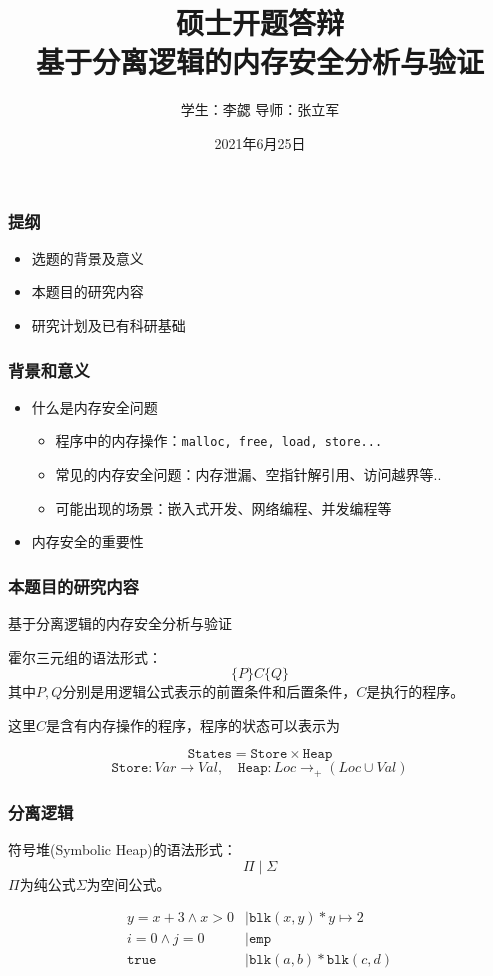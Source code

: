 \documentclass[aspectratio=1610, 11pt]{beamer}
\title{硕士开题答辩\\基于分离逻辑的内存安全分析与验证}
\date{2021年6月25日}
\author{学生：李勰 \qquad 导师：张立军}
\begin{document}
\maketitle

\begin{frame}\frametitle{提纲}
\begin{itemize}
\item 选题的背景及意义
\item 本题目的研究内容
\item 研究计划及已有科研基础
\end{itemize}
\end{frame}
\begin{frame}\frametitle{背景和意义}
\begin{itemize}
\item 什么是内存安全问题

\begin{itemize}
\item 程序中的内存操作：\texttt{malloc, free, load, store...}
\item 
常见的内存安全问题：内存泄漏、空指针解引用、访问越界等..
\item 可能出现的场景：嵌入式开发、网络编程、并发编程等
\end{itemize}


\item 内存安全的重要性

\end{itemize}
\end{frame}

\begin{frame}\frametitle{本题目的研究内容}
\begin{center}
基于分离逻辑的内存安全分析与验证
\end{center}
\pause

\begin{definition}[霍尔三元组]
霍尔三元组的语法形式：
\[\{P\}C\{Q\}\]
其中$P,Q$分别是用逻辑公式表示的前置条件和后置条件，$C$是执行的程序。
\end{definition}

\pause
这里$C$是含有内存操作的程序，程序的状态可以表示为

\[\texttt{States} = \texttt{Store}\times \texttt{Heap}\]
\[\texttt{Store}: Var \rightarrow Val, \quad \texttt{Heap}: Loc \rightarrow_+ (Loc \cup Val)\]


\end{frame}

\begin{frame}\frametitle{分离逻辑}
\begin{definition}[符号堆]
符号堆(Symbolic Heap)的语法形式：
\[\Pi \mid \Sigma \]
$\Pi$为纯公式$\Sigma$为空间公式。
\end{definition}
\begin{example}
\begin{align*}
y = x + 3 \wedge x > 0 &\mid \texttt{blk}(x, y)* y\mapsto 2\\
 i = 0\wedge j = 0 &\mid \texttt{emp}\\
\texttt{true}&\mid \texttt{blk}(a,b) * \texttt{blk}(c,d)\\
\end{align*}
\end{example}
\end{frame}
\end{document}

